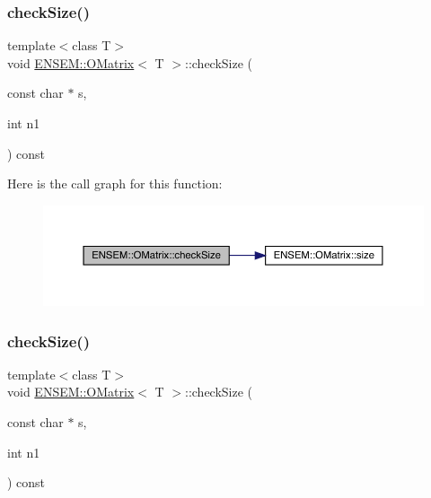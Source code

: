 \subsubsection{\texorpdfstring{checkSize()}{checkSize()}\hspace{0.1cm}{\footnotesize\ttfamily [5/6]}}
{\footnotesize\ttfamily template$<$class T$>$ \\
void \mbox{\hyperlink{classENSEM_1_1OMatrix}{E\+N\+S\+E\+M\+::\+O\+Matrix}}$<$ T $>$\+::check\+Size (\begin{DoxyParamCaption}\item[{const char $\ast$}]{s,  }\item[{int}]{n1 }\end{DoxyParamCaption}) const\hspace{0.3cm}{\ttfamily [inline]}}

Here is the call graph for this function\+:
\nopagebreak
\begin{figure}[H]
\begin{center}
\leavevmode
\includegraphics[width=350pt]{dd/d80/classENSEM_1_1OMatrix_a8e4c3a86b8055f6e67c8fd914b2898ca_cgraph}
\end{center}
\end{figure}
\mbox{\label{classENSEM_1_1OMatrix_a8e4c3a86b8055f6e67c8fd914b2898ca}} 
\subsubsection{\texorpdfstring{checkSize()}{checkSize()}\hspace{0.1cm}{\footnotesize\ttfamily [6/6]}}
{\footnotesize\ttfamily template$<$class T$>$ \\
void \mbox{\hyperlink{classENSEM_1_1OMatrix}{E\+N\+S\+E\+M\+::\+O\+Matrix}}$<$ T $>$\+::check\+Size (\begin{DoxyParamCaption}\item[{const char $\ast$}]{s,  }\item[{int}]{n1 }\end{DoxyParamCaption}) const\hspace{0.3cm}{\ttfamily [inline]}}

